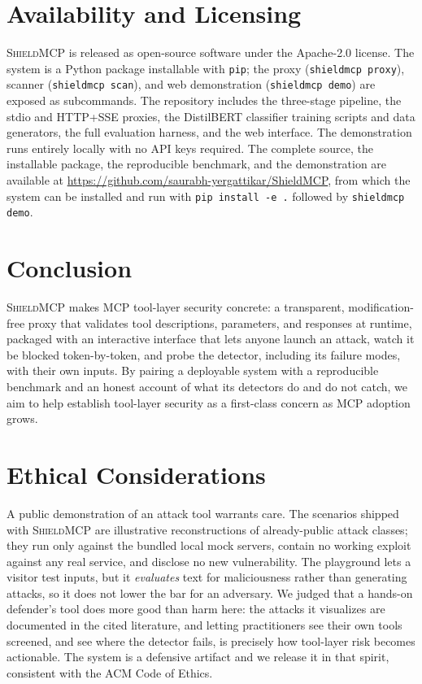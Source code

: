 \documentclass[11pt]{article}
\newcommand{\shield}{\textsc{ShieldMCP}}
\begin{document}
\section{Availability and Licensing}

\shield{} is released as open-source software under the Apache-2.0 license. The
system is a Python package installable with \texttt{pip}; the proxy
(\texttt{shieldmcp proxy}), scanner (\texttt{shieldmcp scan}), and web demonstration
(\texttt{shieldmcp demo}) are exposed as subcommands. The repository includes the
three-stage pipeline, the stdio and HTTP+SSE proxies, the DistilBERT classifier
training scripts and data generators, the full evaluation harness, and the web
interface. The demonstration runs entirely locally with no API keys required. The
complete source, the installable package, the reproducible benchmark, and the
demonstration are available at
\url{https://github.com/saurabh-yergattikar/ShieldMCP}, from which the system can be
installed and run with \texttt{pip install -e .} followed by \texttt{shieldmcp demo}.

\section{Conclusion}

\shield{} makes MCP tool-layer security concrete: a transparent, modification-free
proxy that validates tool descriptions, parameters, and responses at runtime,
packaged with an interactive interface that lets anyone launch an attack, watch it be
blocked token-by-token, and probe the detector, including its failure modes, with
their own inputs. By pairing a deployable system with a reproducible benchmark and an
honest account of what its detectors do and do not catch, we aim to help establish
tool-layer security as a first-class concern as MCP adoption grows.

\section*{Ethical Considerations}

A public demonstration of an attack tool warrants care. The scenarios shipped with
\shield{} are illustrative reconstructions of already-public attack classes; they run
only against the bundled local mock servers, contain no working exploit against any
real service, and disclose no new vulnerability. The playground lets a visitor test
inputs, but it \emph{evaluates} text for maliciousness rather than generating
attacks, so it does not lower the bar for an adversary. We judged that a hands-on
defender's tool does more good than harm here: the attacks it visualizes are
documented in the cited literature, and letting practitioners see their own tools
screened, and see where the detector fails, is precisely how tool-layer risk becomes
actionable. The system is a defensive artifact and we release it in that spirit,
consistent with the ACM Code of Ethics.
\end{document}
